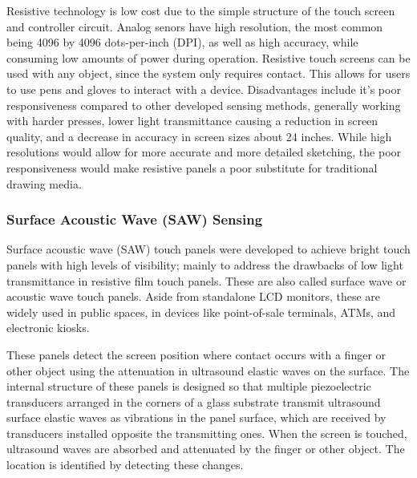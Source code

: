 \documentclass[11pt]{report}
\begin{document}
Resistive technology is low cost due to the simple structure of the touch screen and controller circuit.
Analog senors have high resolution, the most common being 4096 by 4096 dots-per-inch (DPI), as well as high accuracy, while consuming low amounts of power during operation.
Resistive touch screens can be used with any object, since the system only requires contact. 
This allows for users to use pens and gloves to interact with a device.
Disadvantages include it's poor responsiveness compared to other developed sensing methods, generally working with harder presses, lower light transmittance causing a reduction in screen quality, and a decrease in accuracy in screen sizes about 24 inches.
While high resolutions would allow for more accurate and more detailed sketching, the poor responsiveness would make resistive panels a poor substitute for traditional drawing media.

 
\subsubsection{Surface Acoustic Wave (SAW) Sensing}

Surface acoustic wave (SAW) touch panels were developed to achieve bright touch panels with high levels of visibility; mainly to address the drawbacks of low light transmittance in resistive film touch panels. 
These are also called surface wave or acoustic wave touch panels. 
Aside from standalone LCD monitors, these are widely used in public spaces, in devices like point-of-sale terminals, ATMs, and electronic kiosks.

These panels detect the screen position where contact occurs with a finger or other object using the attenuation in ultrasound elastic waves on the surface. 
The internal structure of these panels is designed so that multiple piezoelectric transducers arranged in the corners of a glass substrate transmit ultrasound surface elastic waves as vibrations in the panel surface, which are received by transducers installed opposite the transmitting ones. 
When the screen is touched, ultrasound waves are absorbed and attenuated by the finger or other object. 
The location is identified by detecting these changes.
\end{document}

